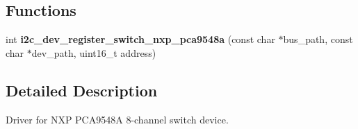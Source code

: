 \subsection*{Functions}
\begin{DoxyCompactItemize}
\item 
\mbox{\label{group__I2CSWITCHNXPPCA9548A_ga27d973187b8638b60ac0d59a95a9f1b1}} 
int {\bfseries i2c\+\_\+dev\+\_\+register\+\_\+switch\+\_\+nxp\+\_\+pca9548a} (const char $\ast$bus\+\_\+path, const char $\ast$dev\+\_\+path, uint16\+\_\+t address)
\end{DoxyCompactItemize}


\subsection{Detailed Description}
Driver for N\+XP P\+C\+A9548A 8-\/channel switch device. 

